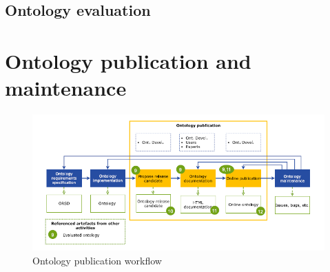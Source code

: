 \newpage
\subsection{Ontology evaluation}

\newpage
\section{Ontology publication and maintenance}
\begin{figure}[H]
    \centering
    \includegraphics[width=0.9\linewidth]{Figures/fig_25.png}
    \caption{Ontology publication workflow}
    \label{fig:enter-label}
\end{figure}
